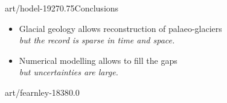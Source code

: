 \documentclass[aspectratio=1610]{beamer}
\begin{document}
%
%
%

    \begin{sectionframe}{art/hodel-1927}{0.75}{Conclusions}
      \begin{itemize}
        \item Glacial geology allows reconstruction of palaeo-glaciers\\
          \emph{\small but the record is sparse in time and space.}
        \pause\bigskip
        \item Numerical modelling allows to fill the gaps\\
          \emph{\small but uncertainties are large.}
      \end{itemize}
    \end{sectionframe}

    \begin{backgroundframe}[b]{art/fearnley-1838}{0.0}{}
      \flushleft{}
    \end{backgroundframe}


\end{document}
